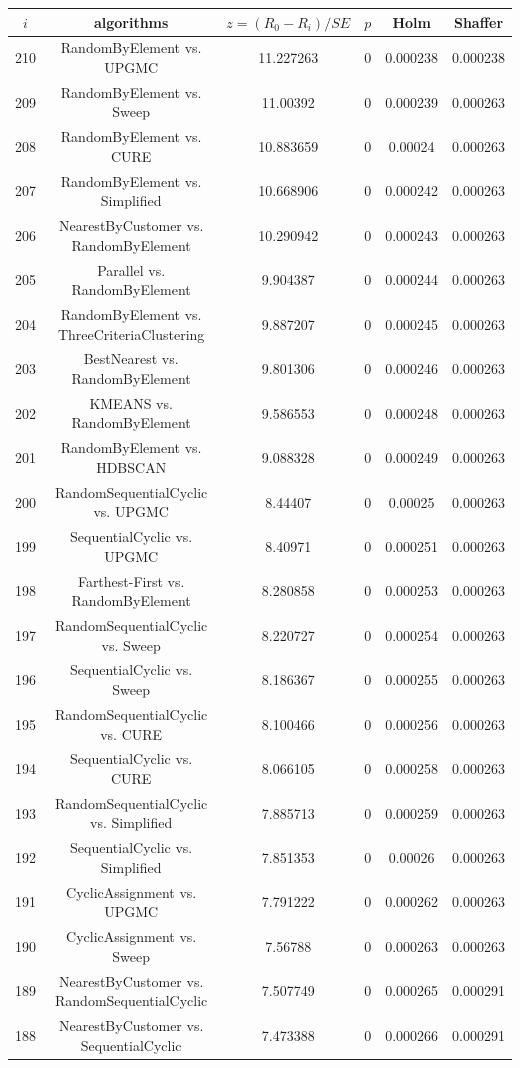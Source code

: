 \documentclass[a4paper,10pt]{article}
\begin{document}
\begin{landscape}
\begin{table}[!htp]
\centering\scriptsize
\begin{tabular}{cccccc}
$i$&algorithms&$z=(R_0 - R_i)/SE$&$p$&Holm&Shaffer\\
\hline210&RandomByElement vs. UPGMC&11.227263&0&0.000238&0.000238\\
209&RandomByElement vs. Sweep&11.00392&0&0.000239&0.000263\\
208&RandomByElement vs. CURE&10.883659&0&0.00024&0.000263\\
207&RandomByElement vs. Simplified&10.668906&0&0.000242&0.000263\\
206&NearestByCustomer vs. RandomByElement&10.290942&0&0.000243&0.000263\\
205&Parallel vs. RandomByElement&9.904387&0&0.000244&0.000263\\
204&RandomByElement vs. ThreeCriteriaClustering&9.887207&0&0.000245&0.000263\\
203&BestNearest vs. RandomByElement&9.801306&0&0.000246&0.000263\\
202&KMEANS vs. RandomByElement&9.586553&0&0.000248&0.000263\\
201&RandomByElement vs. HDBSCAN&9.088328&0&0.000249&0.000263\\
200&RandomSequentialCyclic vs. UPGMC&8.44407&0&0.00025&0.000263\\
199&SequentialCyclic vs. UPGMC&8.40971&0&0.000251&0.000263\\
198&Farthest-First vs. RandomByElement&8.280858&0&0.000253&0.000263\\
197&RandomSequentialCyclic vs. Sweep&8.220727&0&0.000254&0.000263\\
196&SequentialCyclic vs. Sweep&8.186367&0&0.000255&0.000263\\
195&RandomSequentialCyclic vs. CURE&8.100466&0&0.000256&0.000263\\
194&SequentialCyclic vs. CURE&8.066105&0&0.000258&0.000263\\
193&RandomSequentialCyclic vs. Simplified&7.885713&0&0.000259&0.000263\\
192&SequentialCyclic vs. Simplified&7.851353&0&0.00026&0.000263\\
191&CyclicAssignment vs. UPGMC&7.791222&0&0.000262&0.000263\\
190&CyclicAssignment vs. Sweep&7.56788&0&0.000263&0.000263\\
189&NearestByCustomer vs. RandomSequentialCyclic&7.507749&0&0.000265&0.000291\\
188&NearestByCustomer vs. SequentialCyclic&7.473388&0&0.000266&0.000291\\

\end{tabular}
\end{table}
\end{landscape}
\end{document}
